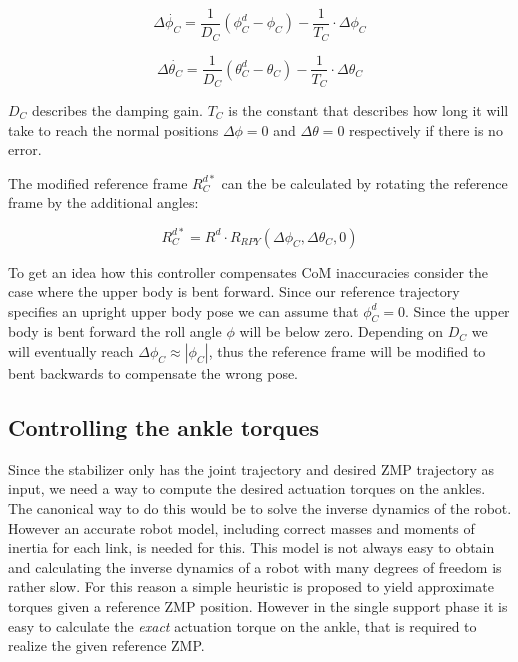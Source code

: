\documentclass[english,ngerman]{KITreprt}
\begin{document}
\begin{equation} \label{eq:chest-dampening-roll}
\Delta \dot{\phi_C} = \frac{1}{D_C} (\phi_C^d - \phi_C) - \frac{1}{T_C} \cdot \Delta \phi_C
\end{equation}

\begin{equation} \label{eq:chest-dampening-pitch}
\Delta \dot{\theta_C} = \frac{1}{D_C} (\theta_C^d - \theta_C) - \frac{1}{T_C} \cdot \Delta \theta_C
\end{equation}

$D_C$ describes the damping gain. $T_C$ is the constant that describes
how long it will take to reach the normal positions $\Delta \phi = 0$
and $\Delta \theta = 0$ respectively if there is no error.

The modified reference frame $R^{d*}_C$ can the be calculated by
rotating the reference frame by the additional angles:

\begin{equation}
R^{d*}_C = R^d \cdot R_{RPY}(\Delta \phi_C, \Delta \theta_C, 0)
\end{equation}

To get an idea how this controller compensates CoM inaccuracies consider
the case where the upper body is bent forward. Since our reference
trajectory specifies an upright upper body pose we can assume that
$\phi_C^d = 0$. Since the upper body is bent forward the roll angle
$\phi$ will be below zero. Depending on $D_C$ we will eventually reach
$\Delta \phi_C \approx |\phi_C|$, thus the reference frame will be
modified to bent backwards to compensate the wrong pose.

\subsection{Controlling the ankle
torques}\label{controlling-the-ankle-torques}

Since the stabilizer only has the joint trajectory and desired ZMP
trajectory as input, we need a way to compute the desired actuation
torques on the ankles. The canonical way to do this would be to solve
the inverse dynamics of the robot. However an accurate robot model,
including correct masses and moments of inertia for each link, is needed
for this. This model is not always easy to obtain and calculating the
inverse dynamics of a robot with many degrees of freedom is rather slow.
For this reason a simple heuristic is proposed to yield approximate
torques given a reference ZMP position. However in the single support
phase it is easy to calculate the \emph{exact} actuation torque on the
ankle, that is required to realize the given reference ZMP.
\end{document}
